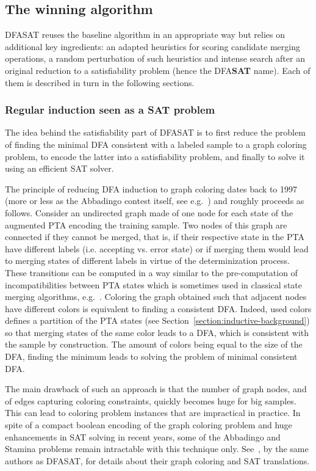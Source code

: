 \subsection{The winning algorithm\label{subsection:stamina-winning}}

DFASAT reuses the baseline algorithm in an appropriate way but relies on additional key ingredients: an adapted heuristics for scoring candidate merging operations, a random perturbation of such heuristics and intense search after an original reduction to a satisfiability problem (hence the DFA\textbf{SAT} name). Each of them is described in turn in the following sections.

\subsubsection*{Regular induction seen as a SAT problem}

The idea behind the satisfiability part of DFASAT is to first reduce the problem of finding the minimal DFA consistent with a labeled sample to a graph coloring problem, to encode the latter into a satisfiability problem, and finally to solve it using an efficient SAT solver. 

The principle of reducing DFA induction to graph coloring dates back to 1997 (more or less as the Abbadingo contest itself, see e.g.~\cite{Coste:1997}) and roughly proceeds as follows. Consider an undirected graph made of one node for each state of the augmented PTA encoding the training sample. Two nodes of this graph are connected if they cannot be merged, that is, if their respective state in the PTA have different labels (i.e. accepting vs. error state) or if merging them would lead to merging states of different labels in virtue of the determinization process. These transitions can be computed in a way similar to the pre-computation of incompatibilities between PTA states which is sometimes used in classical state merging algorithms, e.g.~\cite{Coste:1998, Coste:2004}. Coloring the graph obtained such that adjacent nodes have different colors is equivalent to finding a consistent DFA. Indeed, used colors defines a partition of the PTA states (see Section~\ref{section:inductive-background}) so that merging states of the same color leads to a DFA, which is consistent with the sample by construction. The amount of colors being equal to the size of the DFA, finding the minimum leads to solving the problem of minimal consistent DFA.

The main drawback of such an approach is that the number of graph nodes, and of edges capturing coloring constraints, quickly becomes huge for big samples. This can lead to coloring problem instances that are impractical in practice. In spite of a compact boolean encoding of the graph coloring problem and huge enhancements in SAT solving in recent years, some of the Abbadingo and Stamina problems remain intractable with this technique only. See~\cite{Heule:2010}, by the same authors as DFASAT, for details about their graph coloring and SAT translations.

